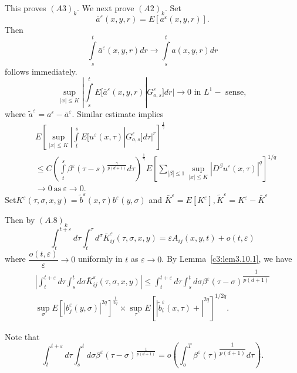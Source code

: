 This proves $(A3)_k$. We next prove $(A2)_k$. Set
$$\bar{a}^{\varepsilon}(x,y,r) = E[a^{\varepsilon}(x,y,r)].$$ 
Then  
$$
\int \limits^t_s \bar{a}^{\varepsilon}(x,y,r) dr \to \int \limits^t_s a(x,y,r)dr
$$
follows immediately.
$$
\sup_{|x| \leq K} | \int \limits^t_s 
E[\bar{a}^{\varepsilon}(x,y,r)|G^{\varepsilon}_{o,s}]dr| \to 0
\text{ in }L^1- \text{ sense}, 
$$
where $\tilde{a}^{\varepsilon}=
a^{\varepsilon}-\bar{a}^{\varepsilon}$. Similar estimate implies  
\begin{align*}
  & E\left[\sup_{|x|\leq K} | \int \limits^s_t E[u^{\varepsilon}(x, \tau)
      |G^{\varepsilon}_{o,s}]d \tau|^r\right]^{\frac{1}{\gamma}}\\ 
  &\leq C \left(\int \limits^s_t
  \beta^{\varepsilon}(\tau-s)^{\frac{\gamma}{p(d+1)}}d
  \tau\right)^{\frac{1}{\gamma}}   E\left[ \sum_{|\beta| \leq 1} \sup_{|x| \leq
      K} |D^{\beta}u^{\varepsilon}(x, \tau)|^q\right]^{1/q}\\ 
  & \to 0 ~\text{as}~ \varepsilon \to 0.
\end{align*}
Set\pageoriginale $K^\varepsilon (\tau, \sigma, x, y) = \tilde{b}^\varepsilon (x,
\tau) b^\varepsilon (y, \sigma)$ and $\bar{K}^\varepsilon =
E[K^\varepsilon ], \tilde{K}^\varepsilon = K^\varepsilon -
\bar{K}^\varepsilon $ 

Then by $(A. 8)_k$
\begin{equation*}
  \int^{t+\varepsilon}_t d \tau \int^\tau_t d^\sigma
  \bar{K}^\varepsilon_{ij} (\tau, \sigma, x, y) = \varepsilon A_{ij}
  (x, y, t) + o(t, \varepsilon) \tag{3.10.10}\label{c3:eq3.10.10} 
\end{equation*}
where $\dfrac{o(t, \varepsilon)}{\varepsilon} \to 0$ uniformly in $t$
as $\varepsilon \to 0$. By Lemma~\ref{c3:lem3.10.1}, we have 
\begin{gather*}
  | \int_t^{t + \varepsilon} d \tau \int^t_s  d \sigma
  \bar{K}_{ij}^\varepsilon (\tau, \sigma, x, y) |   
\le \int_t^{t+ \varepsilon} d \tau \int^t_s d \sigma
\beta^\varepsilon (\tau - \sigma)^{\dfrac{1}{p(d+1)}}\\ 
\sup_\sigma E [|b^\varepsilon _ j (y, \sigma) |^{2q}]^{\frac{1}{2q}}
\times \sup_\tau E[|\tilde{b}_i^\varepsilon (x, \tau)
  + |^{2q}]^{1/2q}. \tag{3.10.11}\label{c3:eq3.10.11}  
\end{gather*}

Note that
$$
\int^{t+\varepsilon}_t d \tau \int_s^t d\sigma \beta^\varepsilon (\tau
- \sigma)^{\frac{1}{p(d+1)}} = o \left( \int^T_o \beta^\varepsilon
(\tau)^{\dfrac{1}{p(d+1)}} d \tau\right). 
$$

